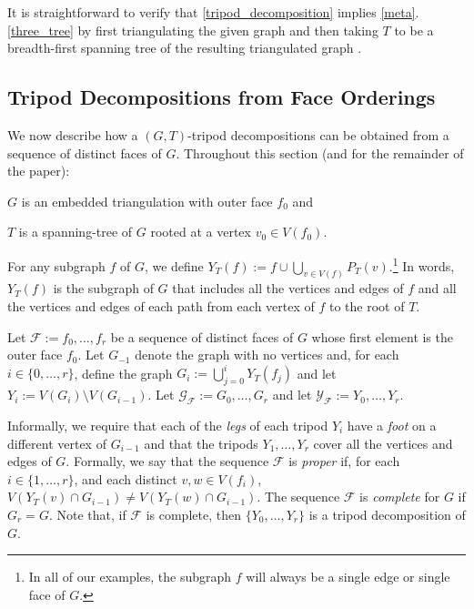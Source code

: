 \documentclass{patmorin}
\begin{document}
It is straightforward to verify that \cref{tripod_decomposition} implies \cref{meta}.\ref{three_tree} by first triangulating the given graph and then taking $T$ to be a breadth-first spanning tree of the resulting triangulated graph \cite[Observation~35]{dujmovic.joret.ea:planar}.


\subsection{Tripod Decompositions from Face Orderings}
\label{orderings}

We now describe how a $(G,T)$-tripod decompositions can be obtained from a sequence of distinct faces of $G$.  Throughout this section (and for the remainder of the paper):
\begin{compactitem}
   \item $G$ is an embedded triangulation with outer face $f_0$ and
   \item $T$ is a spanning-tree of $G$ rooted at a vertex $v_0\in V(f_0)$.
\end{compactitem}
For any subgraph $f$ of $G$, we define $Y_T(f):=f\cup \bigcup_{v\in V(f)} P_T(v)$.\footnote{In all of our examples, the subgraph $f$ will always be a single edge or single face of $G$.}  In words, $Y_T(f)$ is the subgraph of $G$ that includes all the vertices and edges of $f$ and all the vertices and edges of each path from each vertex of $f$ to the root of $T$.

Let $\mathcal{F}:=f_0,\ldots,f_{r}$ be a sequence of distinct faces of $G$ whose first element is the outer face $f_0$. Let $G_{-1}$ denote the graph with no vertices and, for each $i\in\{0,\ldots,r\}$, define the graph $G_i:=\bigcup_{j=0}^i Y_T(f_j)$ and let $Y_i:=V(G_i)\setminus V(G_{i-1})$.  Let $\mathcal{G_F}:= G_0,\ldots,G_{r}$ and let $\mathcal{Y_F}:=Y_0,\ldots,Y_r$.  

Informally, we require that each of the \emph{legs} of each tripod $Y_i$ have  a \emph{foot} on a different vertex of $G_{i-1}$ and that the tripods $Y_1,\ldots,Y_r$ cover all the vertices and edges of $G$. Formally, we say that the sequence $\mathcal{F}$ is \emph{proper} if, for each $i\in\{1,\ldots,r\}$, and each distinct $v,w\in V(f_i)$, $V(Y_T(v)\cap G_{i-1})\neq V(Y_T(w)\cap G_{i-1})$.  The sequence $\mathcal{F}$ is \emph{complete} for $G$ if $G_r=G$.  Note that, if $\mathcal{F}$ is complete, then $\{Y_0,\ldots,Y_r\}$ is a tripod decomposition of $G$.
\end{document}

